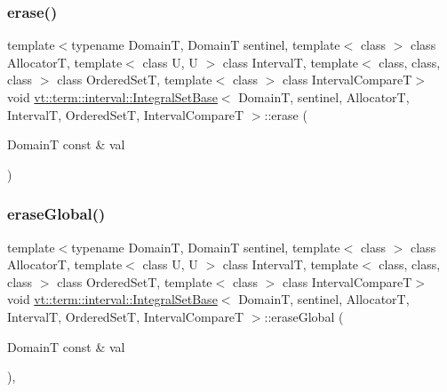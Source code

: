 \subsubsection{\texorpdfstring{erase()}{erase()}}
{\footnotesize\ttfamily template$<$typename DomainT, DomainT sentinel, template$<$ class $>$ class AllocatorT, template$<$ class U, U $>$ class IntervalT, template$<$ class, class, class $>$ class Ordered\+SetT, template$<$ class $>$ class Interval\+CompareT$>$ \\
void \hyperlink{structvt_1_1term_1_1interval_1_1_integral_set_base}{vt\+::term\+::interval\+::\+Integral\+Set\+Base}$<$ DomainT, sentinel, AllocatorT, IntervalT, Ordered\+SetT, Interval\+CompareT $>$\+::erase (\begin{DoxyParamCaption}\item[{DomainT const \&}]{val }\end{DoxyParamCaption})\hspace{0.3cm}{\ttfamily [inline]}}

\mbox{\label{structvt_1_1term_1_1interval_1_1_integral_set_base_ae93298452c48fe7c583f0a7264a7dde2}} 
\subsubsection{\texorpdfstring{erase\+Global()}{eraseGlobal()}}
{\footnotesize\ttfamily template$<$typename DomainT, DomainT sentinel, template$<$ class $>$ class AllocatorT, template$<$ class U, U $>$ class IntervalT, template$<$ class, class, class $>$ class Ordered\+SetT, template$<$ class $>$ class Interval\+CompareT$>$ \\
void \hyperlink{structvt_1_1term_1_1interval_1_1_integral_set_base}{vt\+::term\+::interval\+::\+Integral\+Set\+Base}$<$ DomainT, sentinel, AllocatorT, IntervalT, Ordered\+SetT, Interval\+CompareT $>$\+::erase\+Global (\begin{DoxyParamCaption}\item[{DomainT const \&}]{val }\end{DoxyParamCaption})\hspace{0.3cm}{\ttfamily [inline]}, {\ttfamily [private]}}

\mbox{\label{structvt_1_1term_1_1interval_1_1_integral_set_base_a4f5f1203eb50e1ebaccc479b16af89a1}} 
